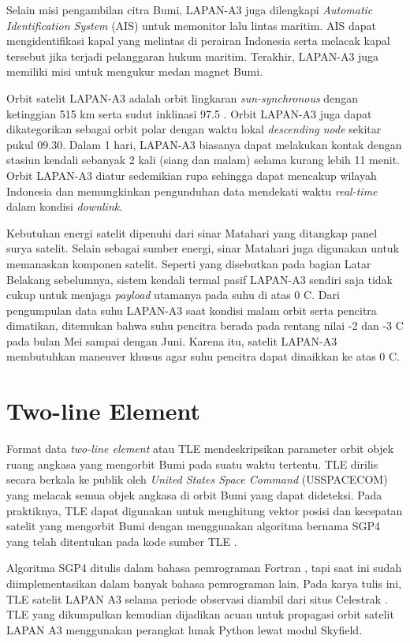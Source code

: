 Selain misi pengambilan citra Bumi, LAPAN-A3 juga dilengkapi \textit{Automatic
Identification System} (AIS) untuk memonitor lalu lintas maritim. AIS dapat
mengidentifikasi kapal yang melintas di perairan Indonesia serta melacak kapal
tersebut jika terjadi pelanggaran hukum maritim. Terakhir, LAPAN-A3 juga
memiliki misi untuk mengukur medan magnet Bumi.

Orbit satelit LAPAN-A3 adalah orbit lingkaran \textit{sun-synchronous} dengan
ketinggian 515 km serta sudut inklinasi 97.5 \degree. Orbit LAPAN-A3 juga dapat
dikategorikan sebagai orbit polar dengan waktu lokal \textit{descending node}
sekitar pukul 09.30. Dalam 1 hari, LAPAN-A3 biasanya dapat melakukan kontak
dengan stasiun kendali sebanyak 2 kali (siang dan malam) selama kurang lebih 11
menit. Orbit LAPAN-A3 diatur sedemikian rupa sehingga dapat mencakup wilayah
Indonesia dan memungkinkan pengunduhan data mendekati waktu \textit{real-time}
dalam kondisi \textit{downlink}.

Kebutuhan energi satelit dipenuhi dari sinar Matahari yang ditangkap panel
surya satelit. Selain sebagai sumber energi, sinar Matahari juga digunakan
untuk memanaskan komponen satelit. Seperti yang disebutkan pada bagian Latar
Belakang sebelumnya, sistem kendali termal pasif LAPAN-A3 sendiri saja tidak
cukup untuk menjaga \textit{payload} utamanya pada suhu di atas 0 \degree C.
Dari pengumpulan data suhu LAPAN-A3 saat kondisi malam orbit serta pencitra
dimatikan, ditemukan bahwa suhu pencitra berada pada rentang nilai -2 dan -3
\degree C pada bulan Mei sampai dengan Juni. Karena itu, satelit LAPAN-A3
membutuhkan maneuver khusus agar suhu pencitra dapat dinaikkan ke atas 0
\degree C.

\section{Two-line Element}

Format data \textit{two-line element} atau TLE mendeskripsikan parameter orbit
objek ruang angkasa yang mengorbit Bumi pada suatu waktu tertentu. TLE dirilis
secara berkala ke publik oleh \textit{United States Space Command} (USSPACECOM)
yang melacak semua objek angkasa di orbit Bumi yang dapat dideteksi. Pada
praktiknya, TLE dapat digunakan untuk menghitung vektor posisi dan kecepatan
satelit yang mengorbit Bumi dengan menggunakan algoritma bernama SGP4 yang
telah ditentukan pada kode sumber TLE \cite{vallado2008}.

Algoritma SGP4 ditulis dalam bahasa pemrograman Fortran \cite{vallado2006},
tapi saat ini sudah diimplementasikan dalam banyak bahasa pemrograman lain.
Pada karya tulis ini, TLE satelit LAPAN A3 selama periode observasi diambil
dari situs Celestrak \cite{kelso}. TLE yang dikumpulkan kemudian
dijadikan acuan untuk propagasi orbit satelit LAPAN A3 menggunakan perangkat
lunak Python lewat modul Skyfield.

